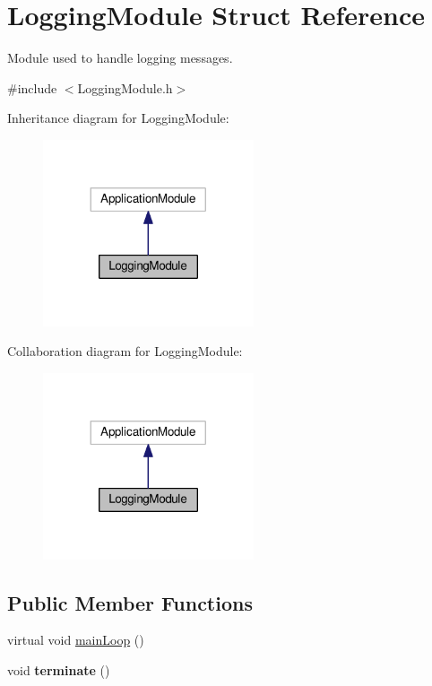 \hypertarget{structLoggingModule}{}\section{Logging\+Module Struct Reference}
\label{structLoggingModule}


Module used to handle logging messages.  




{\ttfamily \#include $<$Logging\+Module.\+h$>$}



Inheritance diagram for Logging\+Module\+:
\nopagebreak
\begin{figure}[H]
\begin{center}
\leavevmode
\includegraphics[width=176pt]{structLoggingModule__inherit__graph}
\end{center}
\end{figure}


Collaboration diagram for Logging\+Module\+:
\nopagebreak
\begin{figure}[H]
\begin{center}
\leavevmode
\includegraphics[width=176pt]{structLoggingModule__coll__graph}
\end{center}
\end{figure}
\subsection*{Public Member Functions}
\begin{DoxyCompactItemize}
\item 
virtual void \hyperlink{structLoggingModule_ae1447048dd90e2a7951d23c33987650f}{main\+Loop} ()
\item 
void {\bfseries terminate} ()\hypertarget{structLoggingModule_add19c1f65a576c57d327430e85dc0e91}{}\label{structLoggingModule_add19c1f65a576c57d327430e85dc0e91}

\end{DoxyCompactItemize}
